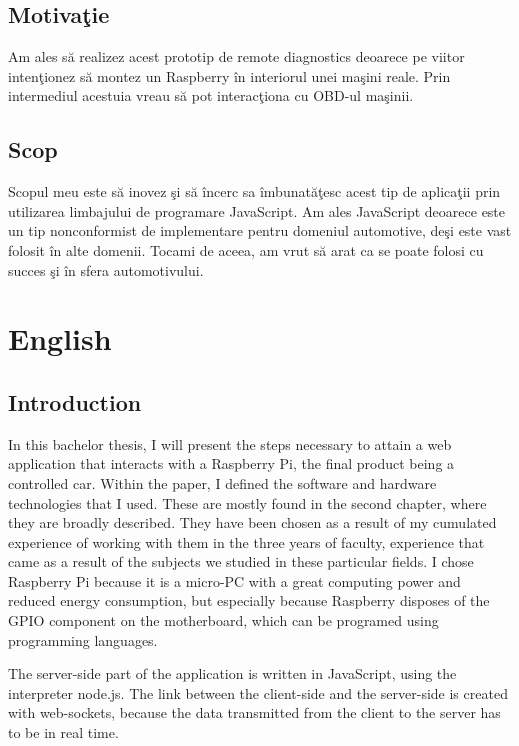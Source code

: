 \subsection{Motiva\c tie}

Am ales s\u a realizez acest prototip de remote diagnostics deoarece pe viitor inten\c tionez s\u a montez un Raspberry \^ in interiorul unei ma\c sini reale. Prin intermediul acestuia vreau s\u a pot interac\c tiona cu OBD-ul ma\c sinii.


\subsection{Scop}

Scopul meu este s\u a inovez \c si s\u a \^ incerc sa \^ imbunat\u a\c tesc acest tip de aplica\c tii prin utilizarea limbajului de programare JavaScript. 
Am ales JavaScript deoarece este un tip nonconformist de implementare pentru domeniul automotive, de\c si este vast folosit \^ in alte domenii. Tocami de aceea, am  vrut s\u a arat ca se poate folosi cu succes \c si \^ in sfera automotivului.
\section{English}

\subsection{Introduction}
In this bachelor thesis, I will present the steps necessary to attain a web application that interacts with a Raspberry Pi, the final product being a controlled car. Within the paper, I defined the software and hardware technologies that I used. These are mostly found in the second chapter, where they are broadly described. They have been chosen as a result of my cumulated experience of working with them in the three years of faculty, experience that came as a result of the subjects we studied in these particular fields. I chose Raspberry Pi because it is a micro-PC with a great computing power and reduced energy consumption, but especially because Raspberry disposes of the GPIO component on the motherboard, which can be programed using programming languages. 

The server-side part of the application is written in JavaScript, using the interpreter node.js. The link between the client-side and the server-side is created with web-sockets, because the data transmitted from the client to the server has to be in real time. 

